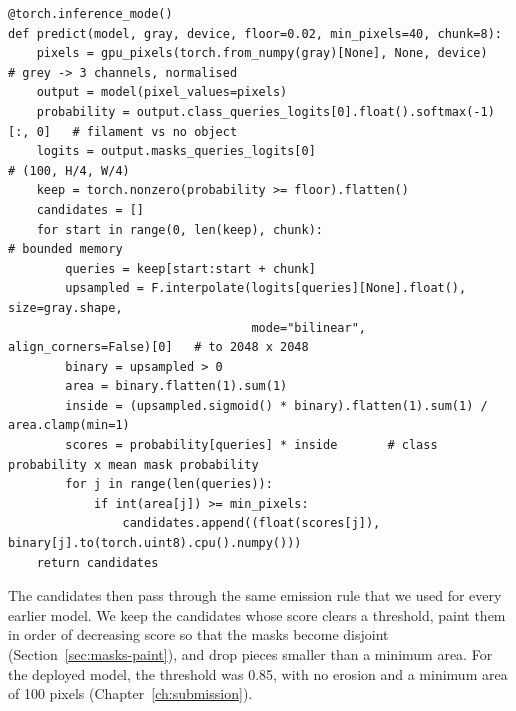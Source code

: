 \begin{lstlisting}[caption={Candidates from one forward pass. Condensed from
\file{experiments/exp\_139\_mask2former/src/model.py:predict}.},label=lst:tr-predict]
@torch.inference_mode()
def predict(model, gray, device, floor=0.02, min_pixels=40, chunk=8):
    pixels = gpu_pixels(torch.from_numpy(gray)[None], None, device)   # grey -> 3 channels, normalised
    output = model(pixel_values=pixels)
    probability = output.class_queries_logits[0].float().softmax(-1)[:, 0]   # filament vs no object
    logits = output.masks_queries_logits[0]                                  # (100, H/4, W/4)
    keep = torch.nonzero(probability >= floor).flatten()
    candidates = []
    for start in range(0, len(keep), chunk):                                 # bounded memory
        queries = keep[start:start + chunk]
        upsampled = F.interpolate(logits[queries][None].float(), size=gray.shape,
                                  mode="bilinear", align_corners=False)[0]   # to 2048 x 2048
        binary = upsampled > 0
        area = binary.flatten(1).sum(1)
        inside = (upsampled.sigmoid() * binary).flatten(1).sum(1) / area.clamp(min=1)
        scores = probability[queries] * inside       # class probability x mean mask probability
        for j in range(len(queries)):
            if int(area[j]) >= min_pixels:
                candidates.append((float(scores[j]), binary[j].to(torch.uint8).cpu().numpy()))
    return candidates
\end{lstlisting}

The candidates then pass through the same emission rule that we used for every earlier model. We keep
the candidates whose score clears a threshold, paint them in order of decreasing score so that the
masks become disjoint (Section~\ref{sec:masks-paint}), and drop pieces smaller than a minimum area. For
the deployed model, the threshold was 0.85, with no erosion and a minimum area of 100 pixels
(Chapter~\ref{ch:submission}).


